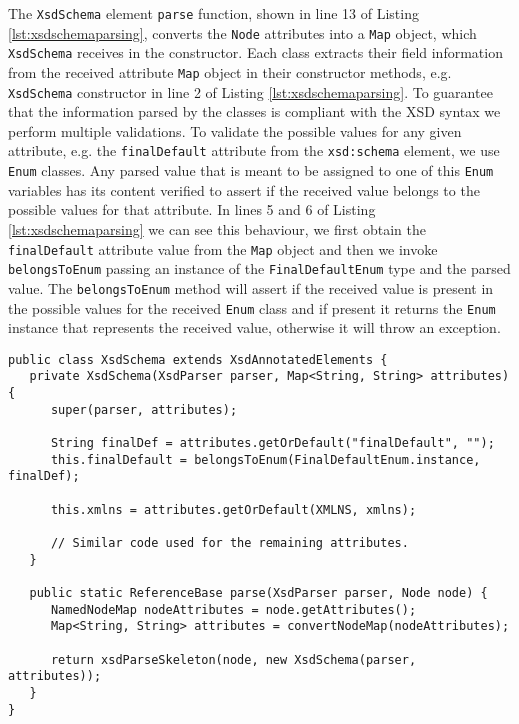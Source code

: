 \noindent
The \texttt{XsdSchema} element \texttt{parse} function, shown in line 13 of Listing \ref{lst:xsdschemaparsing}, converts the \texttt{Node} attributes into a \texttt{Map} object, which \texttt{XsdSchema} receives in the constructor. Each class extracts their field information from the received attribute \texttt{Map} object in their constructor methods, e.g. \texttt{XsdSchema} constructor in line 2 of Listing \ref{lst:xsdschemaparsing}. To guarantee that the information parsed by the classes is compliant with the \ac{XSD} syntax we perform multiple validations. To validate the possible values for any given attribute, e.g. the \texttt{finalDefault} attribute from the \texttt{xsd:schema} element, we use \texttt{Enum} classes. Any parsed value that is meant to be assigned to one of this \texttt{Enum} variables has its content verified to assert if the received value belongs to the possible values for that attribute. In lines 5 and 6 of Listing \ref{lst:xsdschemaparsing} we can see this behaviour, we first obtain the \texttt{finalDefault} attribute value from the \texttt{Map} object and then we invoke \texttt{belongsToEnum} passing an instance of the \texttt{FinalDefaultEnum} type and the parsed value. The \texttt{belongsToEnum} method will assert if the received value is present in the possible values for the received \texttt{Enum} class and if present it returns the \texttt{Enum} instance that represents the received value, otherwise it will throw an exception.

\bigskip


\begin{lstlisting}[caption={XsdSchema Extracting Information from the received Node},captionpos=b,label={lst:xsdschemaparsing}]
public class XsdSchema extends XsdAnnotatedElements {
   private XsdSchema(XsdParser parser, Map<String, String> attributes){
      super(parser, attributes);

      String finalDef = attributes.getOrDefault("finalDefault", "");
      this.finalDefault = belongsToEnum(FinalDefaultEnum.instance, finalDef);

      this.xmlns = attributes.getOrDefault(XMLNS, xmlns);
        
      // Similar code used for the remaining attributes.
   }
    
   public static ReferenceBase parse(XsdParser parser, Node node) {
      NamedNodeMap nodeAttributes = node.getAttributes();
      Map<String, String> attributes = convertNodeMap(nodeAttributes);        
    
      return xsdParseSkeleton(node, new XsdSchema(parser, attributes));
   }
}
\end{lstlisting}

